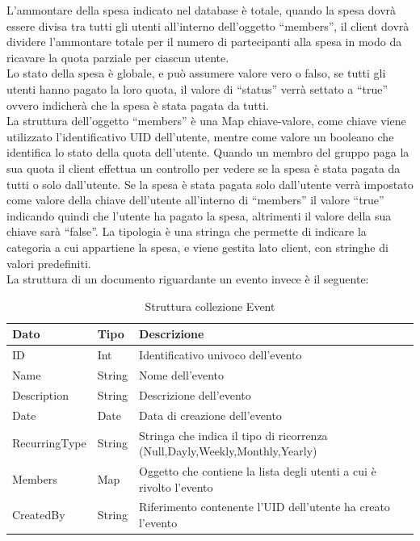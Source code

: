 L'ammontare della spesa indicato nel database è totale, quando la spesa dovrà essere divisa tra tutti gli utenti all'interno dell'oggetto ``members'', il client dovrà dividere l'ammontare totale per il numero di partecipanti alla spesa in modo da ricavare la quota parziale per ciascun utente.\\
Lo stato della spesa è globale, e può assumere valore vero o falso, se tutti gli utenti hanno pagato la loro quota, il valore di ``status'' verrà settato a ``true'' ovvero indicherà che la spesa è stata pagata da tutti.\\
La struttura dell'oggetto ``members'' è una Map chiave-valore, come chiave viene utilizzato l'identificativo UID dell'utente, mentre come valore un booleano che identifica lo stato della quota dell'utente. Quando un membro del gruppo paga la sua quota il client effettua un controllo per vedere se la spesa è stata pagata da tutti o solo dall'utente. Se la spesa è stata pagata solo dall'utente verrà impostato come valore della chiave dell'utente all'interno di ``members'' il valore ``true'' indicando quindi che l'utente ha pagato la spesa, altrimenti il valore della sua chiave sarà ``false''.
La tipologia è una stringa che permette di indicare la categoria a cui appartiene la spesa, e viene gestita lato client, con stringhe di valori predefiniti.\\
La struttura di un documento riguardante un evento invece è il seguente:
\begin{table}[!h]
\begin{center}
\begin{tabular}{|l|l|p{10cm}|}
    \hline
\textbf{Dato} & \textbf{Tipo}  & \textbf{Descrizione}\\ \hline
ID & Int & Identificativo univoco dell'evento \\ \hline
Name & String & Nome dell'evento \\ \hline
Description & String & Descrizione dell'evento \\ \hline
Date & Date & Data di creazione dell'evento \\ \hline
RecurringType & String & Stringa che indica il tipo di ricorrenza (Null,Dayly,Weekly,Monthly,Yearly) \\ \hline
Members & Map & Oggetto che contiene la lista degli utenti a cui è rivolto l'evento \\ \hline
CreatedBy & String &  Riferimento contenente l'UID dell'utente ha creato l'evento \\ \hline
\end{tabular}
\caption[Collezione Event]{Struttura collezione Event}\label{tab:Strutture collezione Event}
\end{center}
\end{table}

